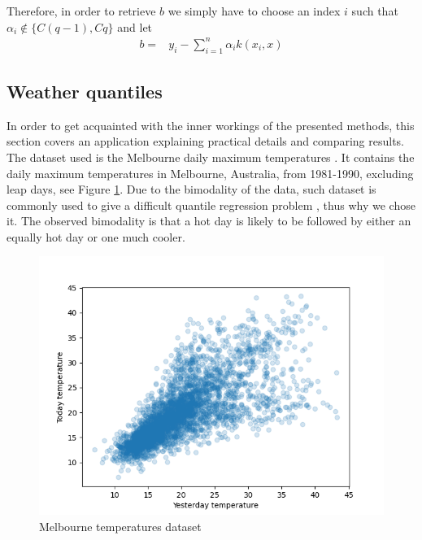 Therefore, in order to retrieve $b$ we simply have to choose an index $i$ such that  $\alpha_i \not \in \{C(q-1), Cq\}$
and let
\begin{equation}
    \begin{aligned}
    b=&y_i-\sum\limits_{i=1}^n \alpha_i k(x_i,x)
    \end{aligned}
\end{equation}


\subsection{Weather quantiles}
In order to get acquainted with the inner workings of the presented methods, this section covers an application explaining practical details and comparing results.
\\
The dataset used is the Melbourne daily maximum temperatures . It contains the daily maximum temperatures in Melbourne, Australia, from 1981-1990, excluding leap days, see Figure \ref{fig:melbourne_temperature_data}.
Due to the bimodality of the data, such dataset is commonly used to give a difficult quantile regression problem \cite{hyndman1996estimating}, thus why we chose it. The observed bimodality is that a hot day is likely to be followed by either an equally hot day or one much cooler.
\begin{figure}[!h]
    \includegraphics[width=\textwidth]{images/melbourne_temperature.png}
    \caption{Melbourne temperatures dataset}
    \label{fig:melbourne_temperature_data}
\end{figure}

